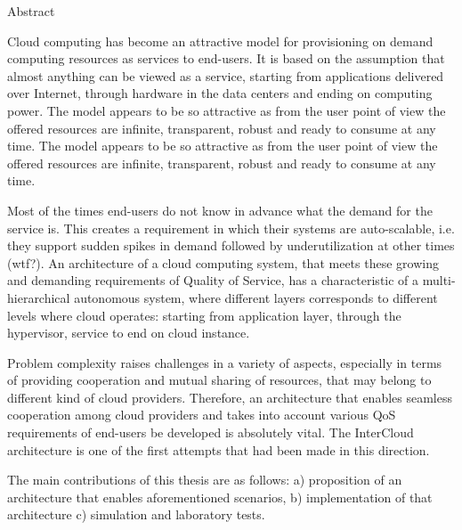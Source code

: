 \vspace*{0.5cm}

\begin{center}
  \LARGE Abstract
\end{center}

Cloud computing has become an attractive model for provisioning on demand computing resources as services to end-users. It is based on the assumption that almost anything can be viewed as a service, starting from applications delivered over Internet, through hardware in the data centers and ending on computing power. The model appears to be so attractive as from the user point of view the offered resources are infinite, transparent, robust and ready to consume at any time. The model appears to be so attractive as from the user point of view the offered resources are infinite, transparent, robust and ready to consume at any time.

Most of the times end-users do not know in advance what the demand for the service is. This creates a requirement in which their systems are auto-scalable, i.e. they support sudden spikes in demand followed by underutilization at other times (wtf?). An architecture of a cloud computing system, that meets these growing and demanding requirements of Quality of Service, has a characteristic of a multi-hierarchical autonomous system, where different layers corresponds to different levels where cloud operates: starting from application layer, through the hypervisor, service to end on cloud instance.

Problem complexity raises challenges in a variety of aspects, especially in terms of providing cooperation and mutual sharing of resources, that may belong to different kind of cloud providers. Therefore, an architecture that enables seamless cooperation among cloud providers and takes into account various QoS requirements of end-users be developed is absolutely vital. The InterCloud architecture is one of the first attempts that had been made in this direction. 

The main contributions of this thesis are as follows: a) proposition of an architecture that enables aforementioned scenarios, b) implementation of that architecture c) simulation and laboratory tests.


